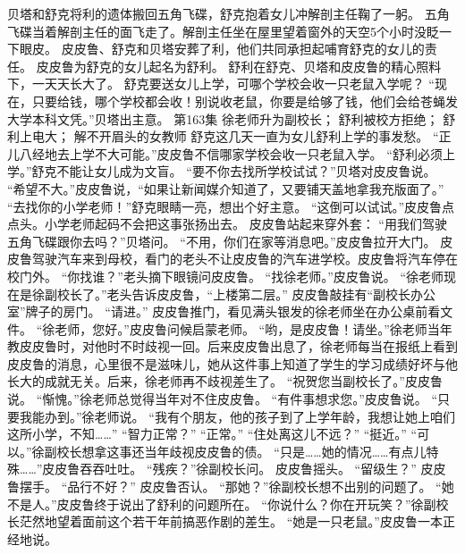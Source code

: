 \documentclass[a4paper,12pt,UTF8,twoside]{ctexbook}
\begin{document}
        贝塔和舒克将利的遗体搬回五角飞碟，舒克抱着女儿冲解剖主任鞠了一躬。 
        五角飞碟当着解剖主任的面飞走了。解剖主任坐在屋里望着窗外的天空5个小时没眨一下眼皮。 
        皮皮鲁、舒克和贝塔安葬了利，他们共同承担起哺育舒克的女儿的责任。 
        皮皮鲁为舒克的女儿起名为舒利。 
        舒利在舒克、贝塔和皮皮鲁的精心照料下，一天天长大了。 
        舒克要送女儿上学，可哪个学校会收一只老鼠入学呢？ 
        “现在，只要给钱，哪个学校都会收！别说收老鼠，你要是给够了钱，他们会给苍蝇发大学本科文凭。”贝塔出主意。   第163集 
        徐老师升为副校长； 
        舒利被校方拒绝； 
        舒利上电大； 
        解不开眉头的女教师   
        舒克这几天一直为女儿舒利上学的事发愁。 
        “正儿八经地去上学不大可能。”皮皮鲁不信哪家学校会收一只老鼠入学。 
        “舒利必须上学。”舒克不能让女儿成为文盲。 
        “要不你去找所学校试试？”贝塔对皮皮鲁说。 
        “希望不大。”皮皮鲁说，“如果让新闻媒介知道了，又要铺天盖地拿我充版面了。” 
        “去找你的小学老师！”舒克眼睛一亮，想出个好主意。 
        “这倒可以试试。”皮皮鲁点点头。小学老师起码不会把这事张扬出去。 
        皮皮鲁站起来穿外套： 
        “用我们驾驶五角飞碟跟你去吗？”贝塔问。 
        “不用，你们在家等消息吧。”皮皮鲁拉开大门。 
        皮皮鲁驾驶汽车来到母校，看门的老头不让皮皮鲁的汽车进学校。皮皮鲁将汽车停在校门外。 
        “你找谁？”老头摘下眼镜问皮皮鲁。 
        “找徐老师。”皮皮鲁说。 
        “徐老师现在是徐副校长了。”老头告诉皮皮鲁，“上楼第二层。” 
        皮皮鲁敲挂有“副校长办公室”牌子的房门。 
        “请进。” 
        皮皮鲁推门，看见满头银发的徐老师坐在办公桌前看文件。 
        “徐老师，您好。”皮皮鲁问候启蒙老师。 
        “哟，是皮皮鲁！请坐。”徐老师当年教皮皮鲁时，对他时不时歧视一回。后来皮皮鲁出息了，徐老师每当在报纸上看到皮皮鲁的消息，心里很不是滋味儿，她从这件事上知道了学生的学习成绩好坏与他长大的成就无关。后来，徐老师再不歧视差生了。 
        “祝贺您当副校长了。”皮皮鲁说。 
        “惭愧。”徐老师总觉得当年对不住皮皮鲁。 
        “有件事想求您。”皮皮鲁说。 
        “只要我能办到。”徐老师说。 
        “我有个朋友，他的孩子到了上学年龄，我想让她上咱们这所小学，不知……” 
        “智力正常？” 
        “正常。” 
        “住处离这儿不远？” 
        “挺近。” 
        “可以。”徐副校长想拿这事还当年歧视皮皮鲁的债。 
        “只是……她的情况……有点儿特殊……”皮皮鲁吞吞吐吐。 
        “残疾？”徐副校长问。 
        皮皮鲁摇头。 
        “留级生？” 
        皮皮鲁摆手。 
        “品行不好？” 
        皮皮鲁否认。 
        “那她？”徐副校长想不出别的问题了。 
        “她不是人。”皮皮鲁终于说出了舒利的问题所在。 
        “你说什么？你在开玩笑？”徐副校长茫然地望着面前这个若干年前搞恶作剧的差生。 
        “她是一只老鼠。”皮皮鲁一本正经地说。 
\end{document}
